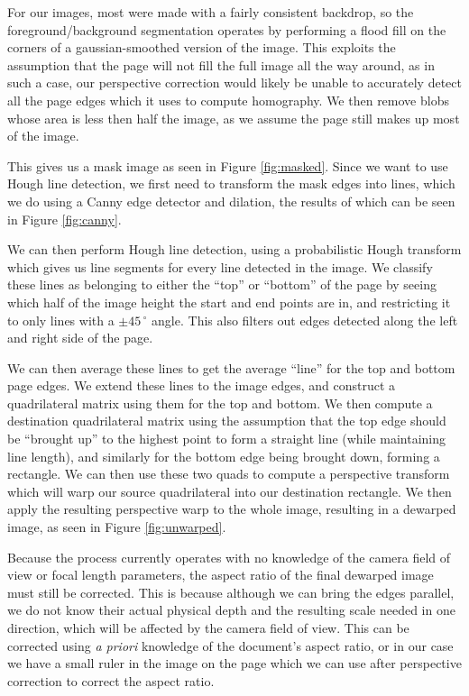 \documentclass[runningheads,a4paper]{llncs}
\begin{document}
For our images, most were made with a fairly consistent backdrop, so the foreground/background segmentation operates by performing a flood fill on the corners of a gaussian-smoothed version of the image. This exploits the assumption that the page will not fill the full image all the way around, as in such a case, our perspective correction would likely be unable to accurately detect all the page edges which it uses to compute homography. We then remove blobs whose area is less then half the image, as we assume the page still makes up most of the image. 

This gives us a mask image as seen in Figure \ref{fig:masked}. Since we want to use Hough line detection, we first need to transform the mask edges into lines, which we do using a Canny edge detector and dilation, the results of which can be seen in Figure \ref{fig:canny}.

We can then perform Hough line detection, using a probabilistic Hough transform which gives us line segments for every line detected in the image. We classify these lines as belonging to either the “top” or “bottom” of the page by seeing which half of the image height the start and end points are in, and restricting it to only lines with a $\pm 45\,^{\circ}$ angle. This also filters out edges detected along the left and right side of the page.

We can then average these lines to get the average “line” for the top and bottom page edges. We extend these lines to the image edges, and construct a quadrilateral matrix using them for the top and bottom. We then compute a destination quadrilateral matrix using the assumption that the top edge should be “brought up” to the highest point to form a straight line (while maintaining line length), and similarly for the bottom edge being brought down, forming a rectangle. We can then use these two quads to compute a perspective transform which will warp our source quadrilateral into our destination rectangle. We then apply the resulting perspective warp to the whole image, resulting in a dewarped image, as seen in Figure \ref{fig:unwarped}.

Because the process currently operates with no knowledge of the camera field of view or focal length parameters,
the aspect ratio of the final dewarped image must still be corrected. This is because although we can bring the
edges parallel, we do not know their actual physical depth and the resulting scale needed in one direction,
which will be affected by the camera field of view. This can be corrected using \emph{a priori} knowledge of the
document's aspect ratio, or in our case we have a small ruler in the image on the page
which we can use after perspective correction to correct the aspect ratio.
\end{document}
